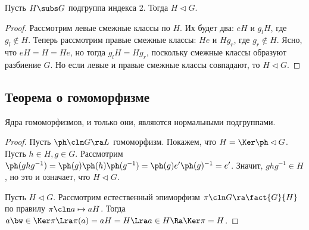 \documentclass[a4paper]{article}
\newcommand{\kph}{\Ker \ph}
\begin{document}
\begin{theorem}
Пусть $H\subs G$ подгруппа индекса 2. Тогда $H \lhd G$.
\end{theorem}
\begin{proof}
Рассмотрим левые смежные классы по $H$. Их будет два: $eH$ и $g_lH$, где $g_l \notin H$.
Теперь рассмотрим правые смежные классы: $He$ и $Hg_r$, где $g_r \notin H$. Ясно,
что $eH=H=He$, но тогда $g_lH=Hg_r$, поскольку смежные классы образуют разбиение $G$. Но
если левые и правые смежные классы совпадают, то $H \lhd G$.
\end{proof}

\subsection{Теорема о гомоморфизме}

\begin{theorem}
Ядра гомоморфизмов, и только они, являются нормальными подгруппами.
\end{theorem}
\begin{proof}
 Пусть $\ph\cln G\ra L$ гомоморфизм. Покажем, что $H=\kph \lhd G$.  Пусть $h \in H, g \in G$. Рассмотрим
$\ph(ghg^{-1})=\ph(g)\ph(h)\ph(g^{-1})= \ph(g)e'\ph(g)^{-1}=e'$. Значит, $ghg^{-1} \in H$, но это и означает,
что $H \lhd G$.

 Пусть $H \lhd G$. Рассмотрим естественный эпиморфизм  $\pi\cln G \ra \fact{G}{H}$ по правилу
$\pi\cln a \mapsto aH$. Тогда $a \bw\in \Ker \pi \Lra \pi(a)=aH=H \Lra a \in H \Ra \Ker \pi = H$.
\end{proof}
\end{document}
